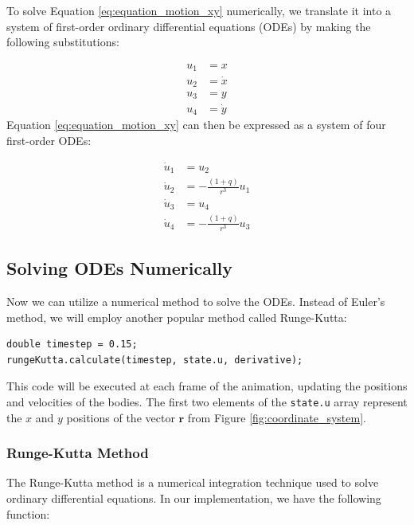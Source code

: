 \documentclass{article}
\begin{document}
To solve Equation \ref{eq:equation_motion_xy} numerically, we translate it into a system of first-order ordinary differential equations (ODEs) by making the following substitutions:

\begin{align}
    u_1 &= x \\
    u_2 &= \dot{x} \\
    u_3 &= y \\
    u_4 &= \dot{y}
\end{align}
Equation \ref{eq:equation_motion_xy} can then be expressed as a system of four first-order ODEs:

\begin{align}
    \dot{u}_1 &= u_2 \\
    \dot{u}_2 &= -\frac{{(1 + q)}}{{r^3}} u_1 \\
    \dot{u}_3 &= u_4 \\
    \dot{u}_4 &= -\frac{{(1 + q)}}{{r^3}} u_3
    \label{eq:first_order_odes}
\end{align}

\subsection*{Solving ODEs Numerically}

Now we can utilize a numerical method to solve the ODEs. Instead of Euler’s method, we will employ another popular method called Runge-Kutta:

\begin{verbatim}
double timestep = 0.15;
rungeKutta.calculate(timestep, state.u, derivative);
\end{verbatim}

This code will be executed at each frame of the animation, updating the positions and velocities of the bodies. The first two elements of the \texttt{state.u} array represent the \(x\) and \(y\) positions of the vector \(\mathbf{r}\) from Figure \ref{fig:coordinate_system}. 

\subsubsection*{Runge-Kutta Method}

The Runge-Kutta method is a numerical integration technique used to solve ordinary differential equations. In our implementation, we have the following function:
\end{document}
